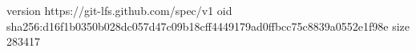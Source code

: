 version https://git-lfs.github.com/spec/v1
oid sha256:d16f1b0350b028dc057d47c09b18cff4449179ad0ffbcc75c8839a0552e1f98e
size 283417
